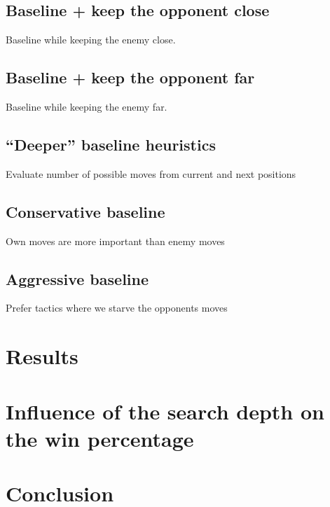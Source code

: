 \documentclass[aps,prd,notitlepage,floatfix,superscriptaddress,groupedaddress,nofootinbib]{revtex4-1}
\begin{document}
\subsection*{Baseline + keep the opponent close}
Baseline while keeping the enemy close.

\subsection*{Baseline + keep the opponent far}
Baseline while keeping the enemy far.

\subsection*{``Deeper'' baseline heuristics}
Evaluate number of possible moves from current and next positions

\subsection*{Conservative baseline}
Own moves are more important than enemy moves

\subsection*{Aggressive baseline}
Prefer tactics where we starve the opponents moves

\section{Results}

\section{Influence of the search depth on the win percentage}

\section{Conclusion}





%

\end{document}
